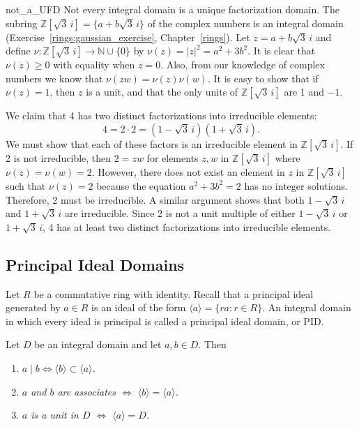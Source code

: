 \begin{example}{not_a_UFD}
Not every integral domain is a unique factorization domain. The
subring ${\mathbb Z}[ \sqrt{3}\, i ] = \{ a + b \sqrt{3}\, i\}$ of the
complex numbers is an integral domain (Exercise~\ref{rings:gaussian_exercise}, Chapter~\ref{rings}). Let
$z = a + b \sqrt{3}\, i$ and define \mbox{$\nu : {\mathbb Z}[ \sqrt{3}\, i ]
\rightarrow {\mathbb N} \cup \{ 0 \}$} by $\nu( z) = |z|^2 = a^2 + 3 b^2$.
It is clear that $\nu(z) \geq 0$ with equality when $z = 0$. Also,
from our knowledge of complex numbers we know that $\nu(z w) = \nu(z)
\nu(w)$. It is easy to show that if $\nu(z) = 1$, then $z$ is a unit,
and that the only units of ${\mathbb Z}[ \sqrt{3}\, i ]$ are 1 and $-1$.   
 

We claim that 4 has two distinct factorizations into irreducible
elements: 
\[
4 = 2 \cdot 2 = (1 - \sqrt{3}\, i) (1 + \sqrt{3}\, i).
\]
We must show that each of these factors is an irreducible element in
${\mathbb Z}[ \sqrt{3}\, i ]$. If 2 is not irreducible, then $2 = z w$ for
elements $z, w$ in ${\mathbb Z}[ \sqrt{3}\, i ]$ where $\nu( z) = \nu(w) =
2$. However, there does not exist an element in $z$ in ${\mathbb
Z}[\sqrt{3}\, i ]$ such that $\nu(z) = 2$ because the equation $a^2 + 3
b^2 = 2$ has no integer solutions. Therefore, 2 must be irreducible. A
similar argument shows that both $1 - \sqrt{3}\, i$ and $1 + \sqrt{3}\, i$
are irreducible. Since 2 is not a unit multiple of either $1 - 
\sqrt{3}\, i$ or $1 + \sqrt{3}\, i$, 4 has at least two distinct
factorizations into irreducible elements.
\mbox{\hspace{1in}}
\end{example}
 

 
\subsection*{Principal Ideal Domains}
 

Let $R$ be a commutative ring with identity. Recall that a principal
ideal generated by $a \in R$ is an ideal of the form $\langle a
\rangle = \{ ra : r \in R \}$. An integral domain in which every ideal
is principal is called a {\bfi principal ideal domain}, or  {\bfi PID}. 
 

\begin{lemma}\label{domains:PI_lemma}
Let $D$ be an integral domain and let $a, b \in D$.
Then  
\begin{enumerate}

\rm\item\it
$a \mid b \Leftrightarrow \langle b \rangle \subset \langle a
\rangle$. 

\rm\item\it
$a$ and $b$ are associates $\Leftrightarrow$ $\langle b \rangle =
\langle a \rangle$.

\rm\item\it
$a$ is a unit in $D$ $\Leftrightarrow$ $\langle a \rangle = D$.

\end{enumerate} 
\end{lemma}


